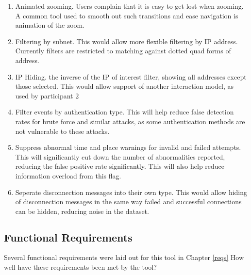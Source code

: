\begin{enumerate}
\item{Animated zooming. Users complain that it is easy to get lost when zooming. A common tool used to smooth out such transitions and ease navigation is animation of the zoom.}
\item{Filtering by subnet. This would allow more flexible filtering by IP address. Currently filters are restricted to matching against dotted quad forms of address.}
\item{IP Hiding. the inverse of the IP of interest filter, showing all addresses except those selected. This would allow support of another interaction model, as used by participant 2}
\item{Filter events by authentication type. This will help reduce false detection rates for brute force and similar attacks, as some authentication methods are not vulnerable to these attacks.}
\item{Suppress abnormal time and place warnings for invalid and failed attempts. This will significantly cut down the number of abnormalities reported, reducing the false positive rate significantly. This will also help reduce information overload from this flag.}
\item{Seperate disconnection messages into their own type. This would allow hiding of disconnection messages in the same way failed and successful connections can be hidden, reducing noise in the dataset.}
\end{enumerate}

\subsection{Functional Requirements}
Several functional requirements were laid out for this tool in Chapter \ref{reqs}
How well have these requirements been met by the tool?

